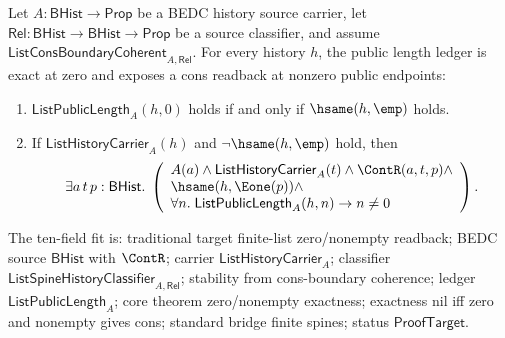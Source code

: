 \begin{theorem}
\label{thm:list-public-zero-length-and-nonempty-readback}
Let $A:\mathsf{BHist}\to\mathsf{Prop}$ be a BEDC history source carrier, let
$\mathsf{Rel}:\mathsf{BHist}\to\mathsf{BHist}\to\mathsf{Prop}$ be a source
classifier, and assume
$\mathsf{ListConsBoundaryCoherent}_{A,\mathsf{Rel}}$. For every history $h$, the
public length ledger is exact at zero and exposes a cons readback at nonzero
public endpoints:
\begin{enumerate}
  \item $\mathsf{ListPublicLength}_A(h,0)$ holds if and only if
  $\hsame(h,\emp)$ holds.
  \item If $\mathsf{ListHistoryCarrier}_A(h)$ and $\neg\hsame(h,\emp)$ hold, then
  $$
  \exists a\,t\,p:\mathsf{BHist}.\;
  \left(
  \begin{array}{l}
  A(a)\land \mathsf{ListHistoryCarrier}_A(t)\land
  \ContR(a,t,p)\land\\
  \hsame(h,\Eone(p))\land\\
  \forall n.\;\mathsf{ListPublicLength}_A(h,n)\to n\neq 0
  \end{array}
  \right).
  $$
\end{enumerate}
The ten-field fit is: traditional target finite-list zero/nonempty readback;
BEDC source $\mathsf{BHist}$ with $\ContR$; carrier
$\mathsf{ListHistoryCarrier}_A$; classifier
$\mathsf{ListSpineHistoryClassifier}_{A,\mathsf{Rel}}$; stability from
cons-boundary coherence; ledger $\mathsf{ListPublicLength}_A$; core theorem
zero/nonempty exactness; exactness nil iff zero and nonempty gives cons;
standard bridge finite spines; status $\mathsf{ProofTarget}$.
\end{theorem}
